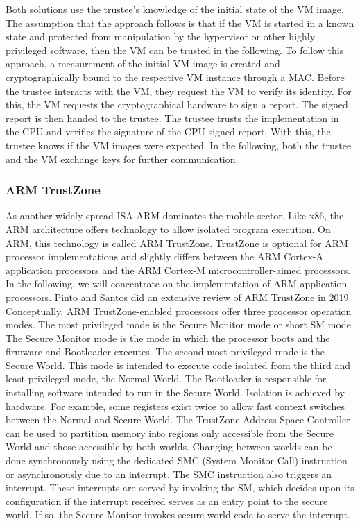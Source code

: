 Both solutions use the trustee's knowledge of the initial state of the VM image. The assumption that the approach
follows is that if the VM is started in a known state and protected from manipulation by the hypervisor or other highly
privileged software, then the VM can be trusted in the following. To follow this approach, a measurement of the initial
VM image is created and cryptographically bound to the respective VM instance through a MAC. Before the trustee
interacts with the VM, they request the VM to verify its identity. For this, the VM requests the cryptographical
hardware to sign a report. The signed report is then handed to the trustee. The trustee trusts the implementation in
the CPU and verifies the signature of the CPU signed report. With this, the trustee knows if the VM images were
expected. In the following, both the trustee and the VM exchange keys for further communication.

\subsubsection{ARM TrustZone}
\label{sec:20:trustzone}
As another widely spread ISA ARM dominates the mobile sector. Like x86, the ARM architecture offers technology to allow
isolated program
execution. On ARM, this technology is called ARM TrustZone. TrustZone is optional for ARM processor implementations and
slightly differs between the ARM Cortex-A application processors and the ARM Cortex-M microcontroller-aimed processors.
In the following, we will concentrate on the implementation of ARM application processors. Pinto and Santos did an
extensive review of ARM TrustZone in 2019.\cite{pinto_demystifying_2019}
Conceptually, ARM TrustZone-enabled processors offer three processor operation modes. The most privileged mode is the
Secure Monitor mode or short SM mode. The Secure Monitor mode is the mode in which the processor boots and the firmware
and Bootloader
executes. The second most privileged mode is the Secure World. This mode is intended to execute code isolated from the
third and least privileged mode, the Normal World. The Bootloader is responsible for installing software intended to run
in the Secure World. Isolation is achieved by hardware. For example, some registers exist twice to allow fast context
switches between the Normal
and Secure World. The TrustZone Address Space Controller can be used to partition memory
into regions only accessible from the Secure World and those accessible by both worlds.
Changing between worlds can be done synchronously using the dedicated SMC (System Monitor Call) instruction or
asynchronously due to an interrupt. The SMC instruction also triggers an interrupt. These interrupts are served by
invoking the
SM, which decides upon its configuration if the interrupt received serves as an entry point to the secure world. If
so, the Secure Monitor invokes secure world code to serve the interrupt.

